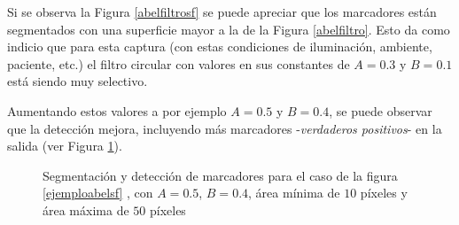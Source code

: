 Si se observa la Figura \ref{abelfiltrosf} se puede apreciar que los marcadores están segmentados con una superficie mayor a la de la Figura \ref{abelfiltro}.  Esto da como indicio que para esta captura (con estas condiciones de iluminación, ambiente, paciente, etc.) el filtro circular con valores en sus constantes de $A=0.3$ y $B=0.1$ está siendo muy selectivo.

Aumentando estos valores a por ejemplo $A=0.5$ y $B=0.4$, se puede observar que la detección mejora, incluyendo más marcadores -\textit{verdaderos positivos}- en la salida (ver Figura \ref{ejemploabel2}).

\begin{figure}[ht!]
        \hspace{-1cm}
        \hspace{1 mm}
  \caption{Segmentación y detección de marcadores para el caso de la figura \ref{ejemploabelsf} , con $A=0.5$, $B=0.4$, área mínima de $10$ píxeles y área máxima de $50$ píxeles}
      \label{ejemploabel2}
\end{figure}

